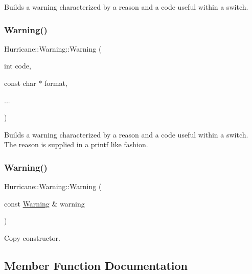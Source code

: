 Builds a warning characterized by a reason and a code useful within a switch. \mbox{\label{classHurricane_1_1Warning_aad9cf84a9c08fb2012462e6f38450bf0}} 
\subsubsection{\texorpdfstring{Warning()}{Warning()}\hspace{0.1cm}{\footnotesize\ttfamily [4/5]}}
{\footnotesize\ttfamily Hurricane\+::\+Warning\+::\+Warning (\begin{DoxyParamCaption}\item[{int}]{code,  }\item[{const char $\ast$}]{format,  }\item[{}]{... }\end{DoxyParamCaption})}

Builds a warning characterized by a reason and a code useful within a switch. The reason is supplied in a {\ttfamily printf} like fashion. \mbox{\label{classHurricane_1_1Warning_a5855a8066401c0b1d1b830a3f7c6216e}} 
\subsubsection{\texorpdfstring{Warning()}{Warning()}\hspace{0.1cm}{\footnotesize\ttfamily [5/5]}}
{\footnotesize\ttfamily Hurricane\+::\+Warning\+::\+Warning (\begin{DoxyParamCaption}\item[{const \hyperlink{classHurricane_1_1Warning}{Warning} \&}]{warning }\end{DoxyParamCaption})}

Copy constructor. 

\subsection{Member Function Documentation}
\mbox{\label{classHurricane_1_1Warning_a21827cacf1cb4f53d8a1963bdeb3cd50}} 
